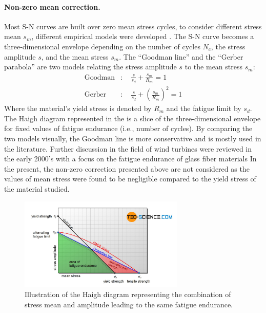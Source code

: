 \paragraph{Non-zero mean correction.}
Most S-N curves are built over zero mean stress cycles, to consider different stress mean $s_m$, different empirical models were developed \citep{suresh_1998_fatigue_book}. 
The S-N curve becomes a three-dimensional envelope depending on the number of cycles $N_c$, the stress amplitude $s$, and the mean stress $s_m$. 
The ``Goodman line'' and the ``Gerber parabola'' are two models relating the stress amplitude $s$ to the mean stress $s_m$:  
\begin{align}
    \mathrm{Goodman} &:\quad \frac{s}{s_d} + \frac{s_m}{R_m} = 1\\
    \mathrm{Gerber} &:\quad \frac{s}{s_d} + \left(\frac{s_m}{R_m}\right)^2 = 1
\end{align}
Where the material's yield stress is denoted by $R_m$ and the fatigue limit by $s_d$. 
The Haigh diagram represented in the  is a slice of the three-dimensional envelope for fixed values of fatigue endurance (i.e., number of cycles).
By comparing the two models visually, the Goodman line is more conservative and is mostly used in the literature. 
Further discussion in the field of wind turbines were reviewed in the early 2000's with a focus on the fatigue endurance of glass fiber materials \citep{sutherland_2000_fatigueWT} 
In the present, the non-zero correction presented above are not considered as the values of mean stress were found to be negligible compared to the yield stress of the material studied. 

\begin{figure}
    \centering
    \includegraphics[width=0.7\textwidth]{./part1/figures/haigh-diagram.jpg}
    \caption{Illustration of the Haigh diagram representing the combination of stress mean and amplitude leading to the same fatigue endurance.}
    \label{fig:haigh_diagram}
\end{figure}



